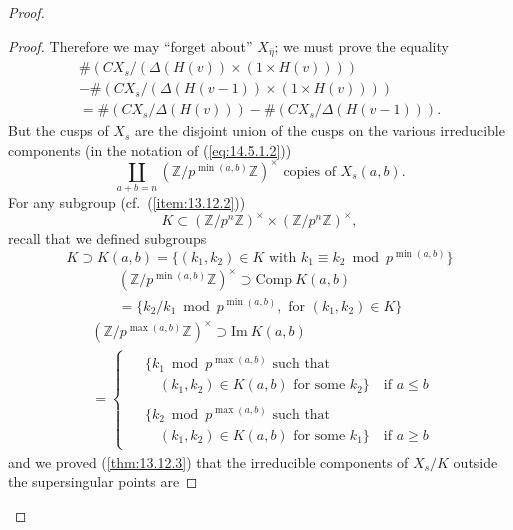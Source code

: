\begin{proof}
\begin{proof}
Therefore we may ``forget about'' $X_{\bar{\eta}}$; we must prove the equality
\begin{multline}\label{eq:14.5.7.2}
\#(CX_s / (\Delta(H(v)) \times (1 \times H(v)))) \\
- \#(CX_s / (\Delta(H(v-1)) \times (1 \times H(v)))) \\
= \#(CX_s / \Delta(H(v))) - \#(CX_s / \Delta(H(v-1))) .
\end{multline}
But the cusps of $X_s$ are the disjoint union of the cusps on the various irreducible components (in the notation of (\ref{eq:14.5.1.2}))
\begin{equation}\label{eq:14.5.7.3}
\coprod_{a+b=n} (\mathbb{Z}/p^{\min(a,b)}\mathbb{Z})^\times \text{ copies of } X_s(a,b) .
\end{equation}
For any subgroup (cf.~(\ref{item:13.12.2}))
\[
K \subset (\mathbb{Z}/p^n\mathbb{Z})^\times \times (\mathbb{Z}/p^n\mathbb{Z})^\times ,
\]
recall that we defined subgroups
\begin{equation}\label{eq:14.5.7.4}
K \supset K(a,b) = \{ (k_1, k_2) \in K \text{ with } k_1 \equiv k_2 \bmod p^{\min(a,b)} \}
\end{equation}
\begin{multline}\label{eq:14.5.7.5}
(\mathbb{Z}/p^{\min(a,b)}\mathbb{Z})^\times \supset \mathrm{Comp}\ K(a,b) \\
= \{ k_2/k_1 \bmod p^{\min(a,b)}, \text{ for } (k_1, k_2) \in K \}
\end{multline}
\begin{equation}\label{eq:14.5.7.6}
\begin{aligned}
&(\mathbb{Z}/p^{\max(a,b)}\mathbb{Z})^\times \supset \mathrm{Im}\ K(a,b) \\
&= \begin{cases}
\begin{aligned}
&\{ k_1 \bmod p^{\max(a,b)} \text{ such that } \\
&\quad (k_1, k_2) \in K(a,b) \text{ for some } k_2 \} \quad \text{if } a \le b
\end{aligned} \\[10pt]
\begin{aligned}
&\{ k_2 \bmod p^{\max(a,b)} \text{ such that } \\
&\quad (k_1, k_2) \in K(a,b) \text{ for some } k_1 \} \quad \text{if } a \ge b
\end{aligned}
\end{cases}
\end{aligned}
\end{equation}
and we proved (\ref{thm:13.12.3}) that the irreducible components of $X_s/K$ outside the supersingular points are

\end{proof}
\end{proof}
